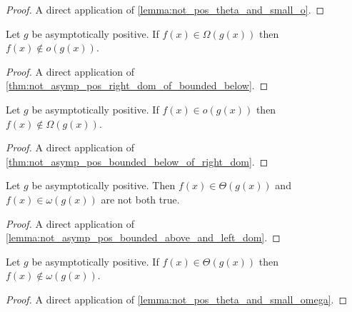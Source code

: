 \begin{proof}
    \leanok
    A direct application of \ref{lemma:not_pos_theta_and_small_o}.
\end{proof}

\begin{lemma}
    \label{lemma:not_pos_o_of_big_omega}
    \leanok
    Let $g$ be asymptotically positive. If $f(x) \in \Omega(g(x))$ then $f(x) \notin o(g(x))$.
\end{lemma}

\begin{proof}
    \leanok
    A direct application of \ref{thm:not_asymp_pos_right_dom_of_bounded_below}.
\end{proof}

\begin{lemma}
    \label{lemma:not_pos_big_omega_of_o}
    \leanok
    Let $g$ be asymptotically positive. If $f(x) \in o(g(x))$ then $f(x) \notin \Omega(g(x))$.
\end{lemma}

\begin{proof}
    \leanok
    A direct application of \ref{thm:not_asymp_pos_bounded_below_of_right_dom}.
\end{proof}

\begin{lemma}
    \label{lemma:not_pos_theta_and_small_omega}
    \leanok
    Let $g$ be asymptotically positive. Then $f(x) \in \Theta(g(x))$ and 
    $f(x) \in \omega(g(x))$ are not both true.
\end{lemma}

\begin{proof}
    \leanok
    A direct application of \ref{lemma:not_asymp_pos_bounded_above_and_left_dom}.
\end{proof}

\begin{lemma}
    \label{lemma:not_pos_small_omega_of_theta}
    \leanok
    Let $g$ be asymptotically positive. If $f(x) \in \Theta(g(x))$ then $f(x) \notin \omega(g(x))$.
\end{lemma}

\begin{proof}
    \leanok
    A direct application of \ref{lemma:not_pos_theta_and_small_omega}.
\end{proof}

